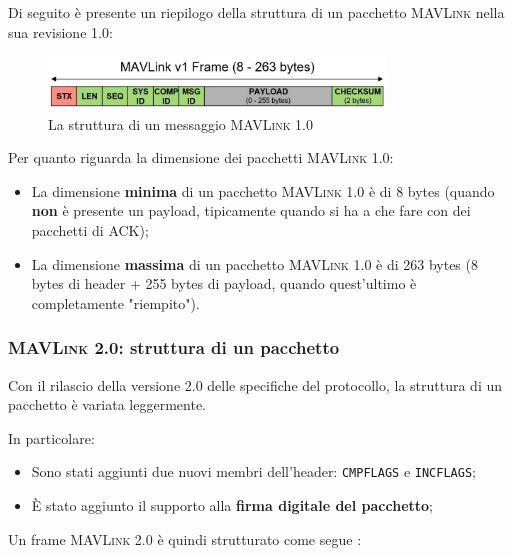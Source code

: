 \documentclass[a4paper, 12pt, oneside]{article}
\theoremstyle{definition}
\begin{document}
Di seguito è presente un riepilogo della struttura di un pacchetto \textsc{MAVLink} nella sua revisione 1.0:

\begin{figure}[H]
    \centering
    \includegraphics[width=0.8\textwidth]{images/packet_mavlink_v1.jpg}
    \caption{La struttura di un messaggio \textsc{MAVLink} 1.0}
\end{figure}

Per quanto riguarda la dimensione dei pacchetti \textsc{MAVLink} 1.0:

\begin{itemize}
    \item La dimensione \textbf{minima} di un pacchetto \textsc{MAVLink} 1.0 è di 8 bytes (quando \textbf{non} è presente un payload, tipicamente quando si ha a che fare con dei pacchetti di ACK);
    \item La dimensione \textbf{massima} di un pacchetto \textsc{MAVLink} 1.0 è di 263 bytes (8 bytes di header + 255 bytes di payload, quando quest'ultimo è completamente "riempito").
\end{itemize}

\newpage

\subsubsection{\textsc{MAVLink} 2.0: struttura di un pacchetto}

Con il rilascio della versione 2.0 delle specifiche del protocollo, la struttura di un pacchetto è variata leggermente.

In particolare:

\begin{itemize}
    \item Sono stati aggiunti due nuovi membri dell'header: \texttt{CMPFLAGS} e \texttt{INCFLAGS};
    \item È stato aggiunto il supporto alla \textbf{firma digitale del pacchetto};\\
\end{itemize}
Un frame \textsc{MAVLink} 2.0 è quindi strutturato come segue \cite{mavlink-2-packet}:
\end{document}
